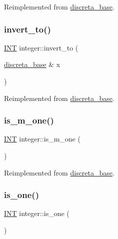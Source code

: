 Reimplemented from \mbox{\hyperlink{classdiscreta__base_a92b3001ac35af9185b316c0d8f89070e}{discreta\+\_\+base}}.

\mbox{\label{classinteger_a9a991b285677b99b4879034e31648b7a}} 
\subsubsection{\texorpdfstring{invert\+\_\+to()}{invert\_to()}}
{\footnotesize\ttfamily \mbox{\hyperlink{galois_8h_a09fddde158a3a20bd2dcadb609de11dc}{I\+NT}} integer\+::invert\+\_\+to (\begin{DoxyParamCaption}\item[{\mbox{\hyperlink{classdiscreta__base}{discreta\+\_\+base}} \&}]{x }\end{DoxyParamCaption})\hspace{0.3cm}{\ttfamily [virtual]}}



Reimplemented from \mbox{\hyperlink{classdiscreta__base_a874a5ffb467f3896604a3c9bdf0cca50}{discreta\+\_\+base}}.

\mbox{\label{classinteger_a7585957656c1152035411e066a4f0053}} 
\subsubsection{\texorpdfstring{is\+\_\+m\+\_\+one()}{is\_m\_one()}}
{\footnotesize\ttfamily \mbox{\hyperlink{galois_8h_a09fddde158a3a20bd2dcadb609de11dc}{I\+NT}} integer\+::is\+\_\+m\+\_\+one (\begin{DoxyParamCaption}{ }\end{DoxyParamCaption})\hspace{0.3cm}{\ttfamily [virtual]}}



Reimplemented from \mbox{\hyperlink{classdiscreta__base_afc2e134e55759cf069f49fcf05af418b}{discreta\+\_\+base}}.

\mbox{\label{classinteger_acf8faabd4ed20f9580605714b5b73a5f}} 
\subsubsection{\texorpdfstring{is\+\_\+one()}{is\_one()}}
{\footnotesize\ttfamily \mbox{\hyperlink{galois_8h_a09fddde158a3a20bd2dcadb609de11dc}{I\+NT}} integer\+::is\+\_\+one (\begin{DoxyParamCaption}{ }\end{DoxyParamCaption})\hspace{0.3cm}{\ttfamily [virtual]}}



